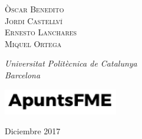 \begin{titlepage}
	{\scshape\Large Òscar Benedito \\ Jordi Castellví \\ Ernesto Lanchares \\ Miquel Ortega \\} %

	\vspace{0.5\baselineskip} %

	\textit{Universitat Politècnica de Catalunya \\ Barcelona} %

	\vfill %


	\includegraphics[width=5cm]{../logo.pdf}

	\vspace{0.3\baselineskip} %
        

	Diciembre 2017 %


\end{titlepage}
